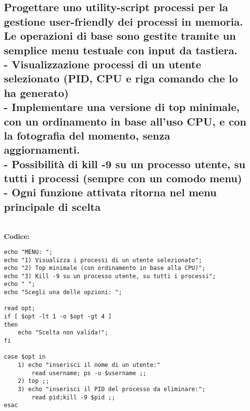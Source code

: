 \subsection{Progettare uno utility-script processi per la gestione user-friendly
dei processi in memoria. Le operazioni di base sono gestite tramite un semplice
menu testuale con input da tastiera. \\
- Visualizzazione processi di un utente selezionato (PID, CPU e riga comando che
lo ha generato) \\
- Implementare una versione di top minimale, con un ordinamento in base all’uso
CPU, e con la fotografia del momento, senza aggiornamenti. \\
- Possibilit\`a di kill -9 su un processo utente, su tutti i processi (sempre
con un comodo menu) \\
- Ogni funzione attivata ritorna nel menu principale di
scelta}

\textbf{\\ Codice:}
\begin{lstlisting}
echo "MENU: ";
echo "1) Visualizza i processi di un utente selezionato";
echo "2) Top minimale (con ordinamento in base alla CPU)";
echo "3) Kill -9 su un processo utente, su tutti i processi";
echo " ";
echo "Scegli una delle opzioni: ";

read opt;
if [ $opt -lt 1 -o $opt -gt 4 ]
then
	echo "Scelta non valida!";
fi

case $opt in
	1) echo "inserisci il nome di un utente:"
		read username; ps -u $username ;;
	2) top ;;
	3) echo "inserisci il PID del processo da eliminare:";
		read pid;kill -9 $pid ;;
esac
\end{lstlisting}